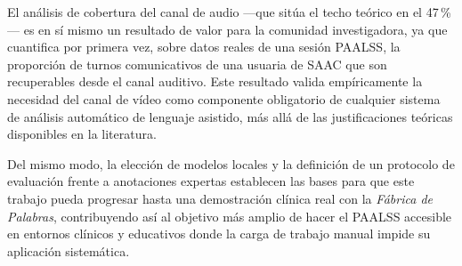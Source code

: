 El análisis de cobertura del canal de audio —que sitúa el techo teórico en el
47\,\%— es en sí mismo un resultado de valor para la comunidad investigadora, ya
que cuantifica por primera vez, sobre datos reales de una sesión \ac{PAALSS}, la
proporción de turnos comunicativos de una usuaria de \ac{SAAC} que son recuperables
desde el canal auditivo. Este resultado valida empíricamente la necesidad del canal
de vídeo como componente obligatorio de cualquier sistema de análisis automático de
lenguaje asistido, más allá de las justificaciones teóricas disponibles en la literatura.

Del mismo modo, la elección de modelos locales y la definición de un protocolo de
evaluación frente a anotaciones expertas establecen las bases para que este trabajo
pueda progresar hasta una demostración clínica real con la \emph{Fábrica de Palabras},
contribuyendo así al objetivo más amplio de hacer el \ac{PAALSS} accesible en entornos
clínicos y educativos donde la carga de trabajo manual impide su aplicación sistemática.


